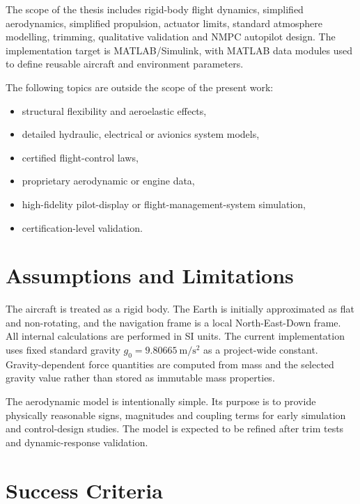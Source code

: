 The scope of the thesis includes rigid-body flight dynamics, simplified aerodynamics, simplified propulsion, actuator limits, standard atmosphere modelling, trimming, qualitative validation and NMPC autopilot design. The implementation target is MATLAB/Simulink, with MATLAB data modules used to define reusable aircraft and environment parameters.

The following topics are outside the scope of the present work:
\begin{itemize}
    \item structural flexibility and aeroelastic effects,
    \item detailed hydraulic, electrical or avionics system models,
    \item certified flight-control laws,
    \item proprietary aerodynamic or engine data,
    \item high-fidelity pilot-display or flight-management-system simulation,
    \item certification-level validation.
\end{itemize}

\section{Assumptions and Limitations}

The aircraft is treated as a rigid body. The Earth is initially approximated as flat and non-rotating, and the navigation frame is a local North-East-Down frame. All internal calculations are performed in SI units. The current implementation uses fixed standard gravity $g_0=\SI{9.80665}{\metre\per\square\second}$ as a project-wide constant. Gravity-dependent force quantities are computed from mass and the selected gravity value rather than stored as immutable mass properties.

The aerodynamic model is intentionally simple. Its purpose is to provide physically reasonable signs, magnitudes and coupling terms for early simulation and control-design studies. The model is expected to be refined after trim tests and dynamic-response validation.

\section{Success Criteria}

